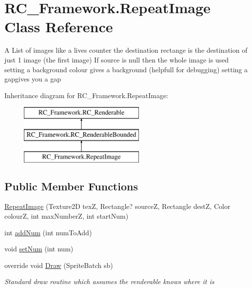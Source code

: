 \hypertarget{class_r_c___framework_1_1_repeat_image}{}\section{R\+C\+\_\+\+Framework.\+Repeat\+Image Class Reference}
\label{class_r_c___framework_1_1_repeat_image}


A List of images like a lives counter the destination rectange is the destination of just 1 image (the first image) If source is null then the whole image is used setting a background colour gives a background (helpfull for debugging) setting a gapgives you a gap  


Inheritance diagram for R\+C\+\_\+\+Framework.\+Repeat\+Image\+:\begin{figure}[H]
\begin{center}
\leavevmode
\includegraphics[height=3.000000cm]{class_r_c___framework_1_1_repeat_image}
\end{center}
\end{figure}
\subsection*{Public Member Functions}
\begin{DoxyCompactItemize}
\item 
\mbox{\hyperlink{class_r_c___framework_1_1_repeat_image_aaa671e1d98cedaf00dccb8b563b5dfc2}{Repeat\+Image}} (Texture2D texZ, Rectangle? sourceZ, Rectangle destZ, Color colourZ, int max\+NumberZ, int start\+Num)
\item 
int \mbox{\hyperlink{class_r_c___framework_1_1_repeat_image_ac3a04a412b50169bf9cb319d355d7afc}{add\+Num}} (int num\+To\+Add)
\item 
void \mbox{\hyperlink{class_r_c___framework_1_1_repeat_image_ab8d0d1a06f74b0a86c984a27a6902d04}{set\+Num}} (int num)
\item 
override void \mbox{\hyperlink{class_r_c___framework_1_1_repeat_image_ad0d9de5911c47f93d7ed1dc48f531283}{Draw}} (Sprite\+Batch sb)
\begin{DoxyCompactList}\small\item\em Standard draw routine which assumes the renderable knows where it is \end{DoxyCompactList}\end{DoxyCompactItemize}
